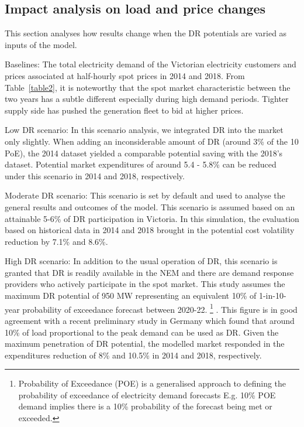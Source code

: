 \documentclass{pasa}%
\begin{document}
\subsection{Impact analysis on load and price changes}
\label{sec:dis5.3}

This section analyses how results change when the DR potentials are varied as inputs of the model.

\begin{unnumlist}
  \item Baselines:
    The total electricity demand of the Victorian electricity customers and prices associated at half-hourly spot prices in 2014 and 2018. From Table~\ref{table2}, it is noteworthy that the spot market characteristic between the two years has a subtle different especially during high demand periods. Tighter supply side has pushed the generation fleet to bid at higher prices.
  \item Low DR scenario:
    In this scenario analysis, we integrated DR into the market only slightly. When adding an inconsiderable amount of DR (around 3\% of the 10 PoE), the 2014 dataset yielded a comparable potential saving with the 2018's dataset. Potential market expenditures of around 5.4 - 5.8\% can be reduced under this scenario in 2014 and 2018, respectively.
  \item Moderate DR scenario:
    This scenario is set by default and used to analyse the general results and outcomes of the model. This scenario is assumed based on an attainable 5-6\% of DR participation in Victoria. In this simulation, the evaluation based on historical data in 2014 and 2018 brought in the potential cost volatility reduction by 7.1\% and 8.6\%.
  \item High DR scenario:
    In addition to the usual operation of DR, this scenario is granted that DR is readily available in the NEM and there are demand response providers who actively participate in the spot market. This study assumes the maximum DR potential of 950 MW representing an equivalent 10\% of 1-in-10-year probability of exceedance forecast between 2020-22. \footnote{Probability of Exceedance (POE) is a generalised approach to defining the probability of exceedance of electricity demand forecasts E.g. 10\% POE demand implies there is a 10\% probability of the forecast being met or exceeded.} \cite{aemoesoo2017}. This figure is in good agreement with a recent preliminary study in Germany which found that around 10\% of load proportional to the peak demand can be used as DR. Given the maximum penetration of DR potential, the modelled market responded in the expenditures reduction of 8\% and 10.5\% in 2014 and 2018, respectively.
\end{unnumlist}
\end{document}
